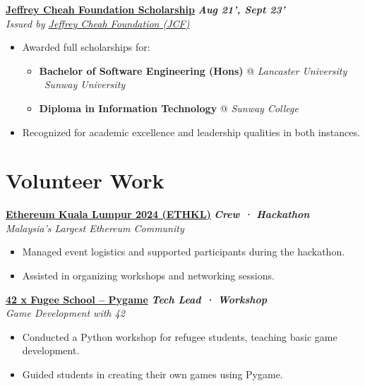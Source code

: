 \documentclass[letterpaper,10pt]{article}
\newcommand{\heading}[2]{
  \hspace{4pt}#1\hfill#2\\
}
\newcommand{\headingBf}[2]{
  \heading{\textbf{#1}}{
    \textbf{\textit{\small{#2}}}
  }
}
\newenvironment{bulletList}{
  \begin{itemize}[itemsep=1pt, parsep=1pt, leftmargin=26pt]
}{
  \end{itemize}
}
\newcommand{\oneFrag}[4]{
  \headingBf{#1}{#2}
  \hspace{6pt}\textit{#3}
  \vspace{-4pt}
  #4
}
\newenvironment{nestedBulletList}{
  \begin{itemize}[itemsep=1pt, parsep=1pt, leftmargin=14pt]
}{
  \end{itemize}
}
\begin{document}
\vspace{2pt}
\oneFrag{
  \href{https://scholarship.sunway.edu.my/scholarship/jeffrey-cheah-foundation-scholarship}{Jeffrey Cheah Foundation Scholarship}
}{
  Aug 21', Sept 23'
}{
  Issued by \href{https://jeffreycheah.foundation}{Jeffrey Cheah Foundation (JCF)}
}{
  \begin{bulletList}
    \item Awarded full scholarships for:
    \vspace{-4pt}
    \begin{nestedBulletList}
      \item \textbf{Bachelor of Software Engineering (Hons)} @ \textit{Lancaster University \textbar\ Sunway University}
      \item \textbf{Diploma in Information Technology} @ \textit{Sunway College}
    \end{nestedBulletList}
    \item Recognized for academic excellence and leadership qualities in both instances.
  \end{bulletList}
}


\section{Volunteer Work}

\oneFrag{
  \href{https://www.2024.ethkl.org}{Ethereum Kuala Lumpur 2024 (ETHKL)}
}{
  Crew · Hackathon
}{
  Malaysia's Largest Ethereum Community
}{
  \begin{bulletList}
    \item Managed event logistics and supported participants during the hackathon.
    \item Assisted in organizing workshops and networking sessions.
  \end{bulletList}
}

\vspace{2pt}
\oneFrag{
  \href{https://www.linkedin.com/feed/update/urn:li:activity:7219932643142901760}{42 x Fugee School -- Pygame}
}{
  Tech Lead · Workshop
}{
  Game Development with 42
}{
  \begin{bulletList}
    \item Conducted a Python workshop for refugee students, teaching basic game development.
    \item Guided students in creating their own games using Pygame.
  \end{bulletList}
}
\end{document}
